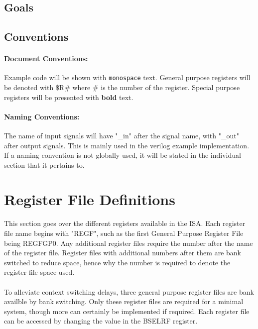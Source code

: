 \documentclass[letterpaper, 11pt]{article}
\begin{document}
\subsection{Goals}
\subsection{Conventions}
\paragraph{Document Conventions:}Example code will be shown with \texttt{monospace} text. General purpose registers will be denoted with
\$R\# where \# is the number of the register. Special purpose registers will be presented with \textbf{bold} text.
\paragraph{Naming Conventions:}The name of input signals will have "\_in" after the signal name, with "\_out" after output signals.
This is mainly used in the verilog example implementation. If a naming convention is not globally used, it will be stated in the individual section that it pertains to. 


\section{Register File Definitions}
\paragraph{}This section goes over the different registers available in the ISA. Each register file name begins with 
"REGF", such as the first General Purpose Register File being REGFGP0. Any additional register files require the number after the
name of the register file. Register files with additional numbers after them are bank switched to reduce space, hence why the number is
required to denote the register file space used.
\paragraph{}To alleviate context switching delays, three general purpose register files are bank availble by bank switching. Only these register files are required
for a minimal system, though more can certainly be implemented if required. Each register file can be accessed by changing the value in the BSELRF register. 
\end{document}
